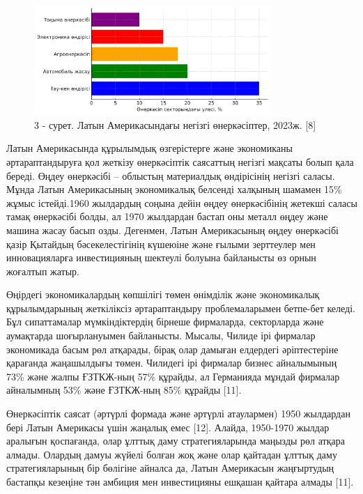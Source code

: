 \begin{figure}[H]
	\centering
	\includegraphics[width=0.8\textwidth]{media/ekon2/image53}
	\caption*{3 - сурет. Латын Америкасындағы негізгі өнеркәсіптер, 2023ж. {[}8{]}}
\end{figure}

\begin{multicols}{2}
Латын Америкасында құрылымдық өзгерістерге және экономиканы
әртараптандыруға қол жеткізу өнеркәсіптік саясаттың негізгі мақсаты
болып қала береді. Өңдеу өнеркәсібі -- облыстың материалдық өндірісінің
негізгі саласы. Мұнда Латын Америкасының экономикалық белсенді халқының
шамамен 15\% жұмыс істейді.1960 жылдардың соңына дейін өңдеу
өнеркәсібінің жетекші саласы тамақ өнеркәсібі болды, ал 1970 жылдардан
бастап оны металл өңдеу және машина жасау басып озды. Дегенмен, Латын
Америкасының өңдеу өнеркәсібі қазір Қытайдың бәсекелестігінің күшеюіне
және ғылыми зерттеулер мен инновацияларға инвестицияның шектеулі болуына
байланысты өз орнын жоғалтып жатыр.

Өңірдегі экономикалардың көпшілігі төмен өнімділік және экономикалық
құрылымдарының жеткіліксіз әртараптандыру проблемаларымен бетпе-бет
келеді. Бұл сипаттамалар мүмкіндіктердің бірнеше фирмаларда, секторларда
және аумақтарда шоғырлануымен байланысты. Мысалы, Чилиде ірі фирмалар
экономикада басым рөл атқарады, бірақ олар дамыған елдердегі
әріптестеріне қарағанда жаңашылдығы төмен. Чилидегі ірі фирмалар бизнес
айналымының 73\% және жалпы ҒЗТКЖ-ның 57\% құрайды, ал Германияда мұндай
фирмалар айналымның 53\% және ҒЗТКЖ-ның 85\% құрайды {[}11{]}.

Өнеркәсіптік саясат (әртүрлі формада және әртүрлі атаулармен) 1950
жылдардан бері Латын Америкасы үшін жаңалық емес {[}12{]}. Алайда,
1950-1970 жылдар аралығын қоспағанда, олар ұлттық даму стратегияларында
маңызды рөл атқара алмады. Олардың дамуы жүйелі болған жоқ және олар
қайтадан ұлттық даму стратегияларының бір бөлігіне айналса да, Латын
Америкасын жаңғыртудың бастапқы кезеңіне тән амбиция мен инвестицияны
ешқашан қайтара алмады {[}11{]}.


\end{multicols}

